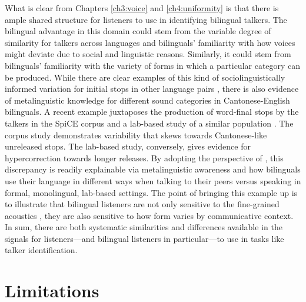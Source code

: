 What is clear from Chapters \ref{ch3:voice} and \ref{ch4:uniformity} is that there is ample shared structure for listeners to use in identifying bilingual talkers. The bilingual advantage in this domain could stem from the variable degree of similarity for talkers across languages and bilinguals' familiarity with how voices might deviate due to social and linguistic reasons. Similarly, it could stem from bilinguals' familiarity with the variety of forms in which a particular category can be produced. While there are clear examples of this kind of sociolinguistically informed variation for initial stops in other language pairs \citep{bullock_2009_sociophonetics}, there is also evidence of metalinguistic knowledge for different sound categories in Cantonese-English bilinguals. A recent example juxtaposes the production of word-final stops by the talkers in the SpiCE corpus \citep{johnson_2021_language} and a lab-based study of a similar population \citep{polinsky_2018_heritage}. The corpus study demonstrates variability that skews towards Cantonese-like unreleased stops. The lab-based study, conversely, gives evidence for hypercorrection towards longer releases. By adopting the perspective of \citet{bullock_2009_sociophonetics}, this discrepancy is readily explainable via metalinguistic awareness and how bilinguals use their language in different ways when talking to their peers versus speaking in formal, monolingual, lab-based settings. The point of bringing this example up is to illustrate that bilingual listeners are not only sensitive to the fine-grained acoustics \citep{ju_2004_falling}, they are also sensitive to how form varies by communicative context. In sum, there are both systematic similarities and differences available in the signals for listeners---and bilingual listeners in particular---to use in tasks like talker identification.

\section{Limitations}\label{ch5:sec:limitations}

